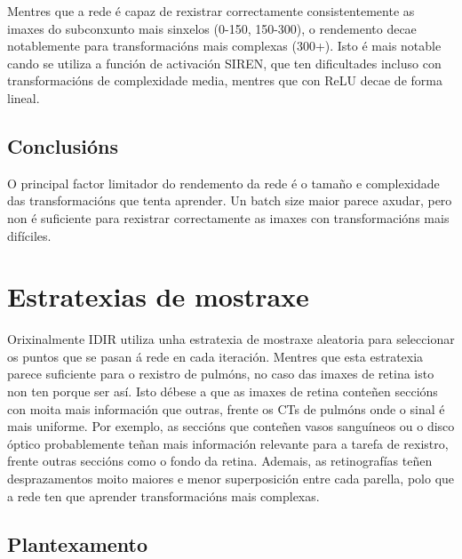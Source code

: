 Mentres que a rede é capaz de rexistrar correctamente consistentemente as imaxes do subconxunto mais sinxelos (0-150, 150-300), o rendemento decae notablemente para transformacións mais complexas (300+). 
Isto é mais notable cando se utiliza a función de activación SIREN, que ten dificultades incluso con transformacións de complexidade media, mentres que con ReLU decae de forma lineal.

\subsection{Conclusións}
\label{subsec:Conclusions-batchsize}

O principal factor limitador do rendemento da rede é o tamaño e complexidade das transformacións que tenta aprender.
Un batch size maior parece axudar, pero non é suficiente para rexistrar correctamente as imaxes con transformacións mais difíciles.

\section{Estratexias de mostraxe}
\label{sec:Estratexias de mostraxe}

Orixinalmente IDIR utiliza unha estratexia de mostraxe aleatoria para seleccionar os puntos que se pasan á rede en cada iteración.
Mentres que esta estratexia parece suficiente para o rexistro de pulmóns, no caso das imaxes de retina isto non ten porque ser así.
Isto débese a que as imaxes de retina conteñen seccións con moita mais información que outras, frente os CTs de pulmóns onde o sinal é mais uniforme.
Por exemplo, as seccións que conteñen vasos sanguíneos ou o disco óptico probablemente teñan mais información relevante para a tarefa de rexistro, frente outras seccións como o fondo da retina.
Ademais, as retinografías teñen desprazamentos moito maiores e menor superposición entre cada parella, polo que a rede ten que aprender transformacións mais complexas.

\subsection{Plantexamento}
\label{subsec:Plantexamento-sampling}

